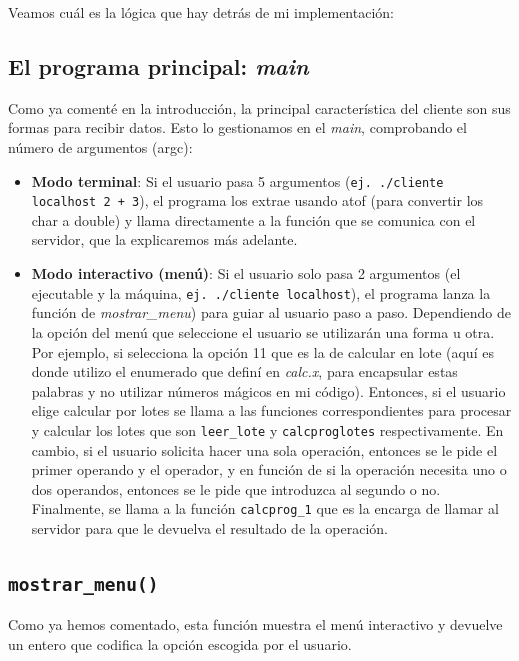 \documentclass[a4paper,12pt]{article}
\begin{document}
	Veamos cuál es la lógica que hay detrás de mi implementación:
	
	\subsection{El programa principal: \textit{main}}
		Como ya comenté en la introducción, la principal característica del cliente son sus formas para recibir datos. Esto lo gestionamos en el \textit{main}, comprobando el número de argumentos (argc):
		
		\begin{itemize}
			\item 	\textbf{Modo terminal}: Si el usuario pasa 5 argumentos (\texttt{ej. ./cliente localhost 2 + 3}), el programa los extrae usando atof (para convertir los char a double) y llama directamente a la función que se comunica con el servidor, que la explicaremos más adelante.
			
			\item \textbf{ Modo interactivo (menú)}: Si el usuario solo pasa 2 argumentos (el ejecutable y la máquina, \texttt{ej. ./cliente localhost}), el programa lanza la función de \textit{mostrar\_menu}) para guiar al usuario paso a paso. Dependiendo de la opción del menú que seleccione el usuario se utilizarán una forma u otra. Por ejemplo, si selecciona la opción 11 que es la de calcular en lote (aquí es donde utilizo el enumerado que definí en \textit{calc.x}, para encapsular estas palabras y no utilizar números mágicos en mi código). Entonces, si el usuario elige calcular por lotes se llama a las funciones correspondientes para procesar y calcular los lotes que son \texttt{leer\_lote} y \texttt{calcproglotes} respectivamente. En cambio, si el usuario solicita hacer una sola operación, entonces se le pide el primer operando y el operador, y en función de si la operación necesita uno o dos operandos, entonces se le pide que introduzca al segundo o no. Finalmente, se llama a la función \texttt{calcprog\_1} que es la encarga de llamar al servidor para que le devuelva el resultado de la operación.
		\end{itemize}
		
	\subsection{\texttt{mostrar\_menu()}}
		Como ya hemos comentado, esta función muestra el menú interactivo y devuelve un entero que codifica la opción escogida por el usuario.
	
\end{document}
